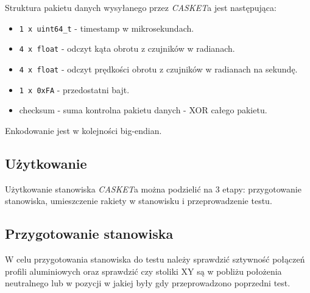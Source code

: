 Struktura pakietu danych wysyłanego przez \textit{CASKET}a jest następująca:
\begin{itemize}
    \item \texttt{1 x uint64\_t} - timestamp w mikrosekundach.
    \item \texttt{4 x float} - odczyt kąta obrotu z czujników w radianach.
    \item \texttt{4 x float} - odczyt prędkości obrotu z czujników w radianach na sekundę.
    \item \texttt{1 x 0xFA} - przedostatni bajt.
    \item checksum - suma kontrolna pakietu danych - XOR całego pakietu.
\end{itemize}
Enkodowanie jest w kolejności big-endian.

\subsection{Użytkowanie}
\label{subsec:casket-uzytkowanie}
Użytkowanie stanowiska \textit{CASKET}a można podzielić na 3 etapy: przygotowanie stanowiska, umieszczenie rakiety w stanowisku i przeprowadzenie testu.
\subsection{Przygotowanie stanowiska}
\label{subsec:casket-przygotowanie}
W celu przygotowania stanowiska do testu należy sprawdzić sztywność
połączeń profili aluminiowych oraz sprawdzić czy stoliki XY są w pobliżu położenia neutralnego lub
w pozycji w jakiej były gdy przeprowadzono poprzedni test.

